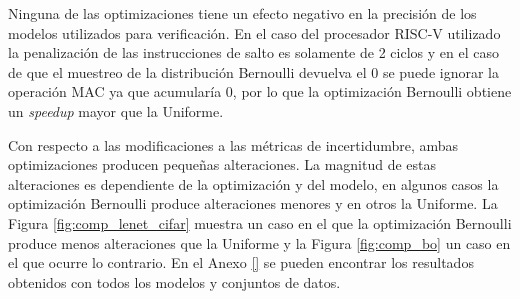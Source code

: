 Ninguna de las optimizaciones tiene un efecto negativo en la precisión de los modelos utilizados para verificación. En el caso del procesador RISC-V utilizado la penalización de las instrucciones de salto es solamente de 2 ciclos y en el caso de que el muestreo de la distribución Bernoulli devuelva el 0 se puede ignorar la operación MAC ya que acumularía 0, por lo que la optimización Bernoulli obtiene un \textit{speedup} mayor que la Uniforme.

Con respecto a las modificaciones a las métricas de incertidumbre, ambas optimizaciones producen pequeñas alteraciones. La magnitud de estas alteraciones es dependiente de la optimización y del modelo, en algunos casos la optimización Bernoulli produce alteraciones menores y en otros la Uniforme. La Figura \ref{fig:comp_lenet_cifar} muestra un caso en el que la optimización Bernoulli produce menos alteraciones que la Uniforme y la Figura \ref{fig:comp_bo} un caso en el que ocurre lo contrario. En el Anexo \ref{} se pueden encontrar los resultados obtenidos con todos los modelos y conjuntos de datos.


